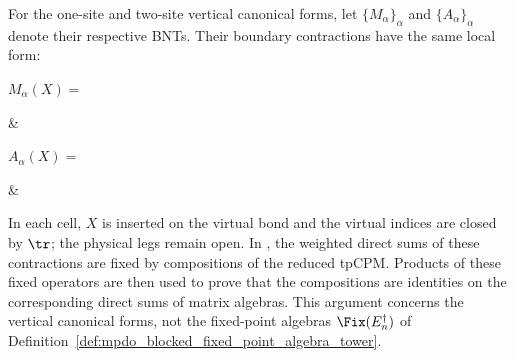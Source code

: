 For the one-site and two-site vertical canonical forms, let
$\{M_\alpha\}_\alpha$ and $\{A_\alpha\}_\alpha$ denote their respective
BNTs. Their boundary contractions have the same local form:
\begin{center}
    \tenkzkernel
    $M_\alpha(X)=$
    \begin{tenkz}[rows={wire}, cols=2, boundary=periodic]
         &
    \end{tenkz}
    \qquad
    $A_\alpha(X)=$
    \begin{tenkz}[rows={wire}, cols=2, boundary=periodic]
         &
    \end{tenkz}
\end{center}
In each cell, $X$ is inserted on the virtual bond and the virtual indices are
closed by $\tr$; the physical legs remain open. In
\cite[Appendix~C.4, lines~1974--1980]{Cirac2016MPDO_arXiv},
the weighted direct sums of these contractions are fixed by compositions
of the reduced tpCPM. Products of these fixed operators are then used to
prove that the compositions are identities on the corresponding direct sums
of matrix algebras. This argument concerns the vertical canonical forms,
not the fixed-point algebras $\Fix(E_n^\dagger)$ of
Definition~\ref{def:mpdo_blocked_fixed_point_algebra_tower}.


